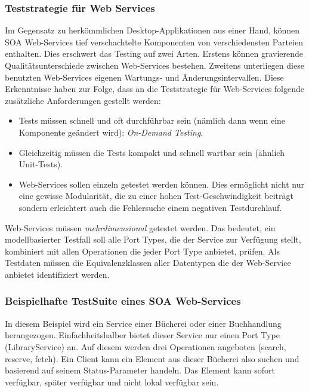\subsubsection{Teststrategie für Web Services}
Im Gegensatz zu herkömmlichen Desktop-Applikationen aus einer Hand, können SOA Web-Services tief verschachtelte Komponenten von verschiedensten Parteien enthalten. Dies erschwert das Testing auf zwei Arten. Erstens können gravierende Qualitätsunterschiede zwischen Web-Services bestehen. Zweitens unterliegen diese benutzten Web-Services eigenen Wartungs- und Änderungsintervallen. Diese Erkenntnisse haben zur Folge, dass an die Teststrategie für Web-Services folgende zusätzliche Anforderungen gestellt werden:

\begin{itemize}
\item Tests müssen schnell und oft durchführbar sein (nämlich dann wenn eine Komponente geändert wird): \textit{On-Demand Testing}.
\item Gleichzeitig müssen die Tests kompakt und schnell wartbar sein (ähnlich Unit-Tests).
\item Web-Services sollen einzeln getestet werden können. Dies ermöglicht nicht nur eine gewisse Modularität, die zu einer hohen Test-Geschwindigkeit beiträgt sondern erleichtert auch die Fehlersuche einem negativen Testdurchlauf.
\end{itemize}

Web-Services müssen \textit{mehrdimensional} getestet werden\cite{_model-driven_2007}. Das bedeutet, ein modellbasierter Testfall soll alle Port Types, die der Service zur Verfügung stellt, kombiniert mit allen Operationen die jeder Port Type anbietet, prüfen. Als Testdaten müssen die Equivalenzklassen aller Datentypen die der Web-Service anbietet identifiziert werden.

\subsubsection{Beispielhafte TestSuite eines SOA Web-Services}
 In diesem Beispiel wird ein Service einer Bücherei oder einer Buchhandlung herangezogen. Einfachheitshalber bietet dieser Service nur einen Port Type (LibraryService) an. Auf diesem werden drei Operationen angeboten (search, reserve, fetch). Ein Client kann ein Element aus dieser Bücherei also suchen und basierend auf seinem Status-Parameter handeln. Das Element kann sofort verfügbar, später verfügbar und nicht lokal verfügbar sein.\\

